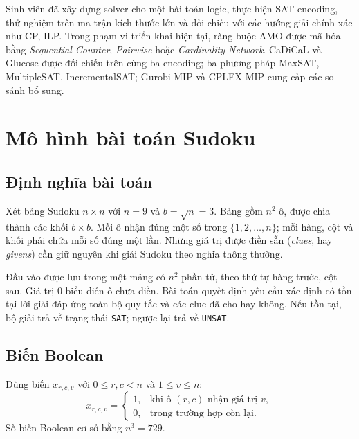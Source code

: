 \documentclass[a4paper,fleqn]{cas-sc}
\begin{document}
Sinh viên đã xây dựng solver cho một bài toán logic, thực hiện SAT encoding, thử nghiệm trên ma trận kích thước lớn và đối chiếu với các hướng giải chính xác như CP, ILP. Trong phạm vi triển khai hiện tại, ràng buộc AMO được mã hóa bằng \emph{Sequential Counter}, \emph{Pairwise} hoặc \emph{Cardinality Network}. CaDiCaL và Glucose được đối chiếu trên cùng ba encoding; ba phương pháp MaxSAT, MultipleSAT, IncrementalSAT; Gurobi MIP và CPLEX MIP cung cấp các so sánh bổ sung.


\section{Mô hình bài toán Sudoku}\label{sec:model}
\subsection{Định nghĩa bài toán}
Xét bảng Sudoku $n\times n$ với $n=9$ và $b=\sqrt n=3$. Bảng gồm $n^2$ ô, được chia thành các khối $b\times b$. Mỗi ô nhận đúng một số trong $\{1,2,\ldots,n\}$; mỗi hàng, cột và khối phải chứa mỗi số đúng một lần. Những giá trị được điền sẵn (\emph{clues}, hay \emph{givens}) cần giữ nguyên khi giải Sudoku theo nghĩa thông thường.

Đầu vào được lưu trong một mảng có $n^2$ phần tử, theo thứ tự hàng trước, cột sau. Giá trị $0$ biểu diễn ô chưa điền. Bài toán quyết định yêu cầu xác định có tồn tại lời giải đáp ứng toàn bộ quy tắc và các clue đã cho hay không. Nếu tồn tại, bộ giải trả về trạng thái \texttt{SAT}; ngược lại trả về \texttt{UNSAT}.

\subsection{Biến Boolean}
Dùng biến $x_{r,c,v}$ với $0\le r,c<n$ và $1\le v\le n$:
\begin{equation}
 x_{r,c,v}=\begin{cases}
   1,&\text{khi ô }(r,c)\text{ nhận giá trị }v,\\
   0,&\text{trong trường hợp còn lại.}
 \end{cases}
 \label{eq:variable}
\end{equation}
Số biến Boolean cơ sở bằng $n^3=729$.
\end{document}
